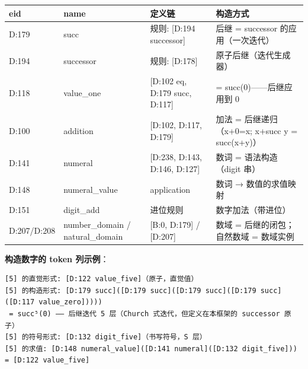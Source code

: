 \documentclass[
]{article}
\newcounter{none} %
\begin{document}
{\def\LTcaptype{none} %
\begin{longtable}[]{@{}
 >{\raggedright\arraybackslash}p{}
 >{\raggedright\arraybackslash}p{}
 >{\raggedright\arraybackslash}p{}
 >{\raggedright\arraybackslash}p{}@{}}
\toprule\noalign{}
\begin{minipage}[b]{\linewidth}\raggedright
eid
\end{minipage} & \begin{minipage}[b]{\linewidth}\raggedright
name
\end{minipage} & \begin{minipage}[b]{\linewidth}\raggedright
定义链
\end{minipage} & \begin{minipage}[b]{\linewidth}\raggedright
构造方式
\end{minipage} \\
\midrule\noalign{}
\endhead
\bottomrule\noalign{}
\endlastfoot
D:179 & succ & 规则: {[}D:194 successor{]} & 后继 = successor
的应用（一次迭代） \\
D:194 & successor & 规则: {[}D:178{]} & 原子后继（迭代生成器） \\
D:118 & value\_one & {[}D:102 eq, D:179 succ, D:117{]} & 1 =
succ(0)------后继应用到 0 \\
D:100 & addition & {[}D:102, D:117, D:179{]} & 加法 = 后继递归（x+0=x;
x+succ y = succ(x+y)） \\
D:141 & numeral & {[}D:238, D:143, D:146, D:127{]} & 数词 =
语法构造（digit 串） \\
D:148 & numeral\_value & application & 数词 → 数值的求值映射 \\
D:151 & digit\_add & 进位规则 & 数字加法（带进位） \\
D:207/D:208 & number\_domain / natural\_domain & {[}B:0, D:179{]} /
{[}D:207{]} & 数域 = 后继的闭包；自然数域 = 数域实例 \\
\end{longtable}
}

\textbf{构造数字的 token 列示例}：

\begin{verbatim}
[5] 的直觉形式: [D:122 value_five]（原子，直觉值）
[5] 的构造形式: [D:179 succ]([D:179 succ]([D:179 succ]([D:179 succ]([D:117 value_zero]))))
 = succ⁵(0) —— 后继迭代 5 层（Church 式迭代，但定义在本框架的 successor 原子）
[5] 的符号形式: [D:132 digit_five]（书写符号，S 层）
[5] 的求值: [D:148 numeral_value]([D:141 numeral]([D:132 digit_five])) = [D:122 value_five]
\end{verbatim}
\end{document}
